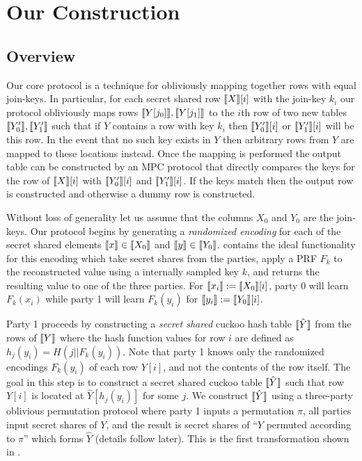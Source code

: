 \section{Our Construction}\label{sec:construction}



\subsection{Overview}

Our core protocol is a technique for obliviously mapping together rows with equal join-keys. In particular, for each secret shared row $\llbracket X\rrbracket[i]$ with the join-key $k_i$ our protocol obliviously maps rows $\llbracket Y[j_0]\rrbracket,\llbracket Y[j_1]\rrbracket$ to the $i$th row of two new tables $\llbracket Y'_0\rrbracket,\llbracket Y'_1\rrbracket$ such that if $Y$ contains a row with key $k_i$ then $\llbracket Y'_0\rrbracket[i]$ or $\llbracket Y'_1\rrbracket[i]$ will be this row. In the event that no such key exists in $Y$ then arbitrary rows from $Y$ are mapped to these locations instead. Once the mapping is performed the output table can be constructed by an MPC protocol\cite{aby3} that directly compares the keys for the row of $\llbracket X\rrbracket[i]$ with $\llbracket Y'_0\rrbracket[i]$ and $\llbracket Y'_1\rrbracket[i]$. If the keys match then the output row is constructed and otherwise a dummy row is constructed. 

Without loss of generality let us assume that the columns $X_0$ and $Y_0$ are the join-keys. Our protocol begins by generating a \emph{randomized encoding} for each of the secret shared elements $\llbracket x\rrbracket\in \llbracket X_0\rrbracket$ and $ \llbracket y\rrbracket\in \llbracket Y_0\rrbracket$.  contains the ideal functionality for this encoding which take secret shares from the parties, apply a PRF $F_k$ to the reconstructed value using a internally sampled key $k$, and returns the resulting value to one of the three parties. For $\llbracket  x_i\rrbracket:= \llbracket X_0\rrbracket[i]$, party 0 will learn $F_k(x_i)$ while party 1 will learn $F_k(y_i)$ for $\llbracket  y_i\rrbracket:=\llbracket Y_0\rrbracket[i]$.

Party 1 proceeds by constructing a \emph{secret shared} cuckoo hash table $\llbracket \hat Y\rrbracket$ from the rows of $\llbracket Y\rrbracket$ where the hash function values for row $i$ are defined as $h_j(y_i) = H( j || F_k(y_i))$. Note that party 1 knows only the randomized encodings $F_k(y_i)$ of each row $Y[i]$, and not the contents of the row itself. The goal in this step is to construct a secret shared cuckoo table $\llbracket \hat Y\rrbracket$ such that row $Y[i]$ is located at $\hat Y[h_j(y_i)]$ for some $j$. We construct  $\llbracket \hat Y\rrbracket$ using a three-party oblivious permutation protocol where party 1 inputs a permutation $\pi$, all parties input secret shares of $Y$, and the result is secret shares of ``$Y$ permuted according to $\pi$'' which forms $\hat Y$ (details follow later). This is the first transformation shown in .

